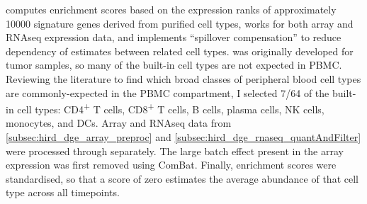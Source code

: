  computes enrichment scores based on the expression ranks of approximately 10000 signature genes derived from purified cell types,
works for both array and \gls{RNAseq} expression data,
and implements \enquote{spillover compensation} to reduce dependency of estimates between related cell types\autocite{aran2017XCellDigitallyPortraying}.
%
%
 was originally developed for tumor samples, so many of the built-in cell types are not expected in \gls{PBMC}.
Reviewing the literature to find which broad classes of peripheral blood cell types are commonly-expected in the \gls{PBMC} compartment\autocite{kleiveland2015PeripheralBloodMononuclear,vanderwijst2018SinglecellRNASequencing,davenport2018DiscoveringVivoCytokineeQTL},
I selected 7/64 of the built-in cell types: CD4\textsuperscript{+} T cells, CD8\textsuperscript{+} T cells, B cells, plasma cells, \gls{NK} cells, monocytes, and \glspl{DC}.
Array and \gls{RNAseq} data from \cref{subsec:hird_dge_array_preproc} and \cref{subsec:hird_dge_rnaseq_quantAndFilter} were processed through  separately.
The large batch effect present in the array expression was first removed using ComBat.
Finally, enrichment scores were standardised, so that a score of zero estimates the average abundance of that cell type across all timepoints.

%

